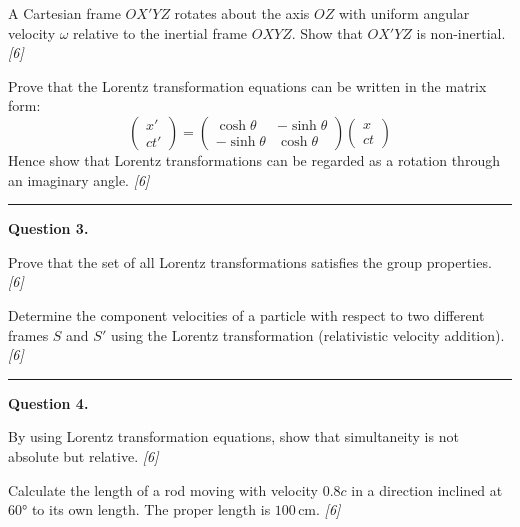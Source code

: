 \documentclass[11pt,a4paper]{article}
\newcommand{\pts}[1]{\hfill   \textit{[#1]}}
\begin{document}
\begin{parts}
  \item A Cartesian frame $OX'YZ$ rotates about the axis $OZ$ with uniform angular velocity $\omega$ relative to the inertial frame $OXYZ$. Show that $OX'YZ$ is non-inertial. \pts{6}
  \item Prove that the Lorentz transformation equations can be written in the matrix form:
  \[
  
\begin{pmatrix} x' \\ ct' \end{pmatrix} = 
\begin{pmatrix} \cosh \theta & -\sinh \theta \\ -\sinh \theta & \cosh \theta \end{pmatrix} 
\begin{pmatrix} x \\ ct \end{pmatrix}
  \]
  Hence show that Lorentz transformations can be regarded as a rotation through an imaginary angle. \pts{6}
\end{parts}

\medskip\rule{\linewidth}{0.2pt}

\medskip


\noindent   \textbf{Question 3.}

\begin{parts}
  \item Prove that the set of all Lorentz transformations satisfies the group properties. \pts{6}
  \item Determine the component velocities of a particle with respect to two different frames $S$ and $S'$ using the Lorentz transformation (relativistic velocity addition). \pts{6}
\end{parts}

\medskip\rule{\linewidth}{0.2pt}

\medskip


\noindent   \textbf{Question 4.}

\begin{parts}
  \item By using Lorentz transformation equations, show that simultaneity is not absolute but relative. \pts{6}
  \item Calculate the length of a rod moving with velocity $0.8c$ in a direction inclined at $60°$ to its own length. The proper length is $100\, \text{cm}$. \pts{6}
\end{parts}
\end{document}
